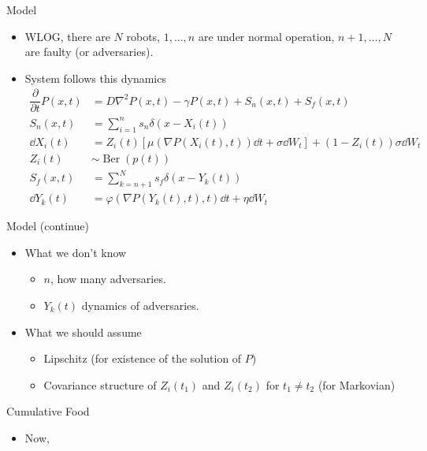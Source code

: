 \documentclass[10pt]{beamer}
\begin{document}
  \begin{frame}{Model}
    \begin{itemize}
      \item WLOG, there are $N$ robots, $1,\dots, n$ are under normal operation, $n+1, \dots, N$ are faulty (or adversaries).
      \item System follows this dynamics
        \begin{align*}
          \dfrac{\partial}{\partial t} P(x,t) &= D\nabla^2 P(x,t) - \gamma P(x,t) + S_n(x,t)+ S_f(x,t)\\
          S_n(x,t) &= \sum_{i=1}^{n}s_n\delta(x-X_i(t))\\
          \dd X_i(t) &= Z_i(t)\left[\mu(\nabla P(X_i(t),t))\dd t + \sigma \dd W_t\right] + (1-Z_i(t))\sigma\dd W_t\\
          Z_i(t) &\sim \operatorname{Ber}(p(t))\\
          S_f(x,t) &= \sum_{k=n+1}^N s_f \delta(x-Y_k(t))\\
          \dd Y_k(t) &= \varphi(\nabla P(Y_k(t),t),t)\dd t + \eta \dd W_t
        \end{align*}
    \end{itemize}
  \end{frame}
  \begin{frame}{Model (continue)}
  \begin{itemize}
  \item What we don't know
        \begin{itemize}
          \item $n$, how many adversaries.
          \item $Y_k(t)$ dynamics of adversaries.
        \end{itemize}
  \item What we should assume
    \begin{itemize}
      \item Lipschitz (for existence of the solution of $P$)
      \item Covariance structure of $Z_i(t_1)$ and $Z_i(t_2)$ for $t_1\neq t_2$ (for Markovian)
    \end{itemize}
  \end{itemize}
  \end{frame}
  \begin{frame}{Cumulative Food}
    \begin{itemize}
      \item Now, 
    \end{itemize}
  \end{frame}
\end{document}
